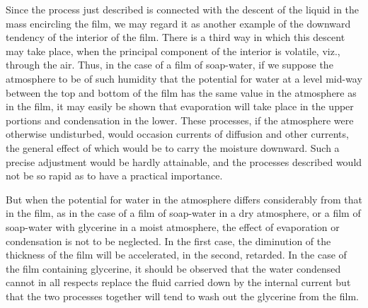 \documentclass[12pt]{article}
\begin{document}
Since the process just described is connected with the descent of the liquid in the mass encircling the film, we may regard it as another example of the downward tendency of the interior of the film. There is a third way in which this descent may take place, when the principal component of the interior is volatile, viz., through the air. Thus, in the case of a film of soap-water, if we suppose the atmosphere to be of such humidity that the potential for water at a level mid-way between the top and bottom of the film has the same value in the atmosphere as in the film, it may easily be shown that evaporation will take place in the upper portions and condensation in the lower. These processes, if the atmosphere were otherwise undisturbed, would occasion currents of diffusion and other currents, the general effect of which would be to carry the moisture downward. Such a precise adjustment would be hardly attainable, and the processes described would not be so rapid as to have a practical importance.

But when the potential for water in the atmosphere differs considerably from that in the film, as in the case of a film of soap-water in a dry atmosphere, or a film of soap-water with glycerine in a moist atmosphere, the effect of evaporation or condensation is not to be neglected. In the first case, the diminution of the thickness of the film will be accelerated, in the second, retarded. In the case of the film containing glycerine, it should be observed that the water condensed cannot in all respects replace the fluid carried down by the internal current but that the two processes together will tend to wash out the glycerine from the film.
\end{document}

